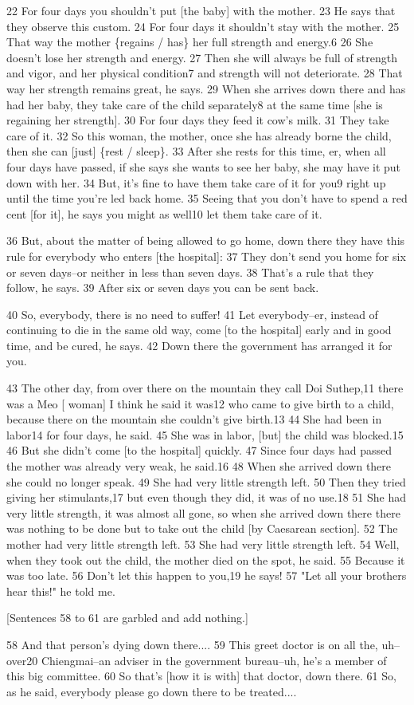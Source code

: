 22 For four days you shouldn't put [the baby] with the mother. 23 He says that
they observe this custom. 24 For four days it shouldn't stay with the mother. 25
That way the mother \{regains / has\} her full strength and energy.6 26 She doesn't
lose her strength and energy. 27 Then she will always be full of strength and vigor,
and her physical condition7 and strength will not deteriorate. 28 That way her
strength remains great, he says. 29 When she arrives down there and has had her
baby, they take care of the child separately8 at the same time [she is regaining
her strength]. 30 For four days they feed it cow's milk. 31 They take care of it.
32 So this woman, the mother, once she has already borne the child, then she can
[just] \{rest / sleep\}. 33 After she rests for this time, er, when all four days
have passed, if she says she wants to see her baby, she may have it put down with
her. 34 But, it's fine to have them take care of it for you9 right up until the
time you're led back home. 35 Seeing that you don't have to spend a red cent [for
it], he says you might as well10 let them take care of it.

36 But, about the matter of being allowed to go home, down there they have this
rule for everybody who enters [the hospital]: 37 They don't send you home for six
or seven days--or neither in less than seven days. 38 That's a rule that they follow,
he says. 39 After six or seven days you can be sent back.

40 So, everybody, there is no need to suffer! 41 Let everybody--er, instead of
continuing to die in the same old way, come [to the hospital] early and in good
time, and be cured, he says. 42 Down there the government has arranged it for you.

43 The other day, from over there on the mountain they call Doi Suthep,11 there
was a Meo [ woman] I think he said it was12 who came to give birth to a child,
because there on the mountain she couldn't give birth.13 44 She had been in labor14
for four days, he said. 45 She was in labor, [but] the child was blocked.15 46
But she didn't come [to the hospital] quickly. 47 Since four days had passed the
mother was already very weak, he said.16 48 When she arrived down there she could
no longer speak. 49 She had very little strength left. 50 Then they tried giving
her stimulants,17 but even though they did, it was of no use.18 51 She had very
little strength, it was almost all gone, so when she arrived down there there was
nothing to be done but to take out the child [by Caesarean section]. 52 The mother
had very little strength left. 53 She had very little strength left. 54 Well, when
they took out the child, the mother died on the spot, he said. 55 Because it was
too late. 56 Don't let this happen to you,19 he says! 57 "Let all your
brothers hear this!" he told me.

[Sentences 58 to 61 are garbled and add nothing.]

58 And that person's dying down there.... 59 This greet doctor is on all the, uh--over20
Chiengmai--an adviser in the government bureau--uh, he's a member of this big committee.
60 So that's [how it is with] that doctor, down there. 61 So, as he said, everybody
please go down there to be treated....

